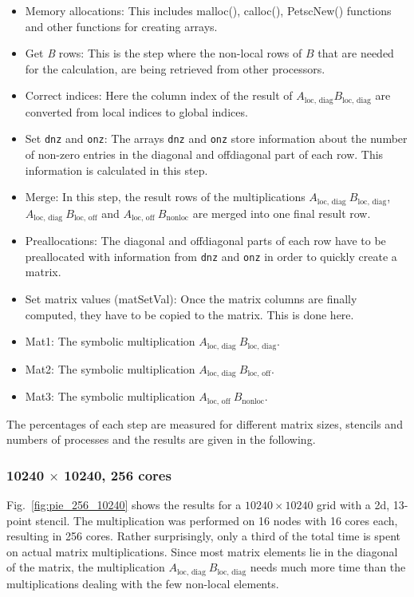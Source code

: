 \begin{itemize}
\item Memory allocations: This includes malloc(), calloc(), PetscNew() functions and other functions for creating arrays.
\item Get \textit{B} rows: This is the step where the non-local rows of $B$ that are needed for the calculation, are being retrieved from other processors.
\item Correct indices: Here the column index of the result of $A_{\textrm{loc, diag}} B_{\textrm{loc, diag}}$ are converted from local indices to global indices.
\item Set \texttt{dnz} and \texttt{onz}: The arrays \texttt{dnz} and \texttt{onz} store information about the number of non-zero entries in the diagonal and offdiagonal part of each row. This information is calculated in this step. 
\item Merge: In this step, the result rows of the multiplications $A_{\textrm{loc, diag~}} B_{\textrm{loc, diag}}$,   \\$A_{\textrm{loc, diag~}} B_{\textrm{loc, off}}$ and $A_{\textrm{loc, off~}} B_{\textrm{nonloc}}$ are merged into one final result row.
\item Preallocations: The diagonal and offdiagonal parts of each row have to be preallocated with information from \texttt{dnz} and \texttt{onz} in order to quickly create a matrix.
\item Set matrix values (matSetVal): Once the matrix columns are finally computed, they have to be copied to the matrix. This is done here.
\item Mat1: The symbolic multiplication $A_{\textrm{loc, diag~}} B_{\textrm{loc, diag}}$.
\item Mat2: The symbolic multiplication $A_{\textrm{loc, diag~}} B_{\textrm{loc, off}}$.
\item Mat3: The symbolic multiplication $A_{\textrm{loc, off~}} B_{\textrm{nonloc}}$.
\end{itemize}

The percentages of each step are measured for different matrix sizes, stencils and numbers of processes and the results are given in the following.

\subsubsection*{10240 $\times$ 10240, 256 cores}
Fig.~\ref{fig:pie_256_10240} shows the results for a $10240 \times 10240$ grid with a 2d, 13-point stencil. The multiplication was performed on 16 nodes with 16 cores each, resulting in 256 cores. Rather surprisingly, only a third of the total time is spent on actual matrix multiplications. Since most matrix elements lie in the diagonal of the matrix, the multiplication $A_{\textrm{loc, diag}}~B_{\textrm{loc, diag}}$ needs much more time than the multiplications dealing with the few non-local elements. 

